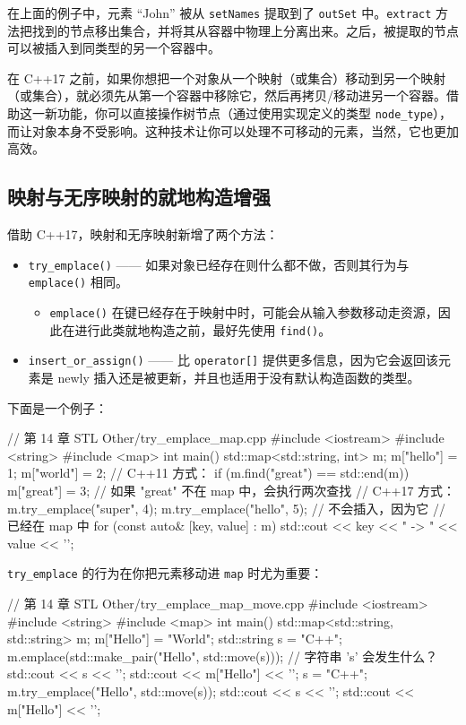 在上面的例子中，元素 “John” 被从 \texttt{setNames} 提取到了 \texttt{outSet} 中。\texttt{extract} 方法把找到的节点移出集合，并将其从容器中物理上分离出来。之后，被提取的节点可以被插入到同类型的另一个容器中。

在 C++17 之前，如果你想把一个对象从一个映射（或集合）移动到另一个映射（或集合），就必须先从第一个容器中移除它，然后再拷贝/移动进另一个容器。借助这一新功能，你可以直接操作树节点（通过使用实现定义的类型 \texttt{node\_type}），而让对象本身不受影响。这种技术让你可以处理不可移动的元素，当然，它也更加高效。


\subsection{映射与无序映射的就地构造增强}

借助 C++17，映射和无序映射新增了两个方法：

\begin{itemize}
\item \texttt{try\_emplace()} —— 如果对象已经存在则什么都不做，否则其行为与 \texttt{emplace()} 相同。
  \begin{itemize}
  \item \texttt{emplace()} 在键已经存在于映射中时，可能会从输入参数移动走资源，因此在进行此类就地构造之前，最好先使用 \texttt{find()}。
  \end{itemize}
\item \texttt{insert\_or\_assign()} —— 比 \texttt{operator[]} 提供更多信息，因为它会返回该元素是 newly 插入还是被更新，并且也适用于没有默认构造函数的类型。
\end{itemize}


下面是一个例子：

\begin{codebox}[cpp]
// 第 14 章 STL Other/try_emplace_map.cpp
#include <iostream>
#include <string>
#include <map>
int main() {
std::map<std::string, int> m;
m["hello"] = 1;
m["world"] = 2;
// C++11 方式：
if (m.find("great") == std::end(m))
m["great"] = 3;
// 如果 "great" 不在 map 中，会执行两次查找
// C++17 方式：
m.try_emplace("super", 4);
m.try_emplace("hello", 5); // 不会插入，因为它
// 已经在 map 中
for (const auto& [key, value] : m)
std::cout << key << " -> " << value << '\n';
}
\end{codebox}

\texttt{try\_emplace} 的行为在你把元素移动进 \texttt{map} 时尤为重要：

\begin{codebox}[cpp]
// 第 14 章 STL Other/try_emplace_map_move.cpp
#include <iostream>
#include <string>
#include <map>
int main() {
std::map<std::string, std::string> m;
m["Hello"] = "World";
std::string s = "C++";
m.emplace(std::make_pair("Hello", std::move(s)));
// 字符串 's' 会发生什么？
std::cout << s << '\n';
std::cout << m["Hello"] << '\n';
s = "C++";
m.try_emplace("Hello", std::move(s));
std::cout << s << '\n';
std::cout << m["Hello"] << '\n';
}
\end{codebox}

